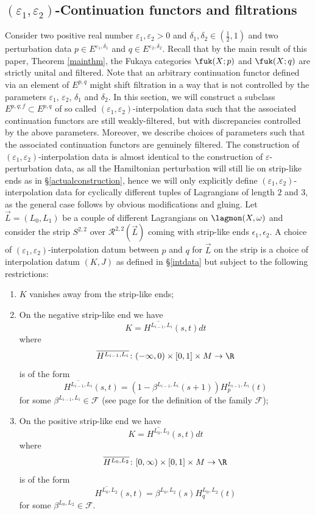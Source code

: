 	\subsection{$(\varepsilon_1,\varepsilon_2)$-Continuation functors and filtrations}\label{contfunandfiltr}
	Consider two positive real number $\varepsilon_1,\varepsilon_2>0$ and $\delta_1,\delta_2\in \left(\frac{1}{2},1\right)$ and two perturbation data $p\in E^{\varepsilon_1, \delta_1}$ and $q\in E^{\varepsilon_2, \delta_2}$. Recall that by the main result of this paper, Theorem \ref{mainthm}, the Fukaya categories $\fuk(X;p)$ and $\fuk(X;q)$ are strictly unital and filtered. Note that an arbitrary continuation functor defined via an element of $E^{p,q}$ might shift filtration in a way that is not controlled by  the parameters $\varepsilon_1$, $\varepsilon_2$, $\delta_1$ and $\delta_2$. In this section, we will construct a subclass $E^{p,q;f}\subset E^{p,q}$ of so called $(\varepsilon_1, \varepsilon_2)$-interpolation data such that the associated continuation functors are still weakly-filtered, but with discrepancies controlled by the above parameters. Moreover, we describe choices of parameters such that the associated continuation functors are genuinely filtered. The construction of $(\varepsilon_1, \varepsilon_2)$-interpolation data is almost identical to the construction of $\varepsilon$-perturbation data, as all the Hamiltonian perturbation will still lie on strip-like ends as in \S \ref{actualconstruction}, hence we will only explicitly define $(\varepsilon_1,\varepsilon_2)$-interpolation data for cyclically different tuples of Lagrangians of length $2$ and $3$, as the general case follows by obvious modifications and gluing.
	Let $\vec{L}=(L_0,L_1)$ be a couple of different Lagrangians on $\lagmon(X,\omega)$ and consider the strip $S^{2,2}$ over $\mathcal{R}^{2,2}(\vec{L})$ coming with strip-like ends $\epsilon_1,\epsilon_2$. A choice of $(\varepsilon_1,\varepsilon_2)$-interpolation datum between $p$ and $q$ for $\vec{L}$ on the strip is a choice of interpolation datum $(K, J)$ as defined in \S \ref{intdata} but subject to the following restrictions: 
	\begin{enumerate}
		\item $K$ vanishes away from the strip-like ends;
		\item On the negative strip-like end we have $$K = \overline{H^{L_{i-1},L_i}}(s,t)dt$$ where $$\overline{H^{L_{i-1},L_i}}\colon (-\infty, 0)\times [0,1]\times M\to \R$$ is of the form $$\overline{H^{L_{i-1},L_i}}(s,t)= (1-\beta^{L_{i-1},L_i}(s+1))H^{L_{i-1},L_i}_{p}(t)$$ for some $\beta^{L_{i-1},L_i}\in \mathcal{F}$ (see page \pageref{definitionofF} for the definition of the family $\mathcal{F}$);
		\item On the positive strip-like end we have $$K = \overline{H^{L_{0},L_2}}(s,t)dt$$ where $$\overline{H^{L_{0},L_2}}\colon[0,\infty)\times [0,1]\times M\to \R$$ is of the form $$\overline{H^{L_{0},L_2}}(s,t) = \beta^{L_0,L_2}(s)H^{L_0,L_2}_{q}(t)$$ for some $\beta^{L_0,L_2}\in \mathcal{F}$.
	\end{enumerate}
